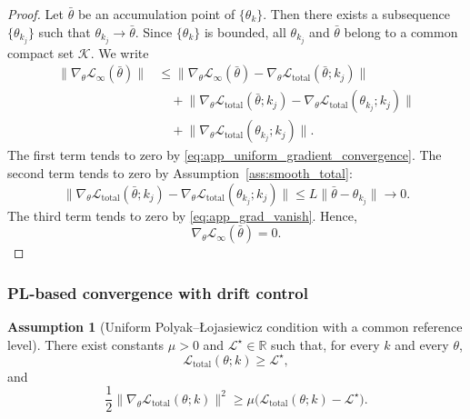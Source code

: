 \documentclass{article}
\theoremstyle{plain}
\theoremstyle{definition}
\newtheorem{assumption}[theorem]{Assumption}
\theoremstyle{remark}
\begin{document}
\begin{proof}
	Let $\bar{\theta}$ be an accumulation point of $\{\theta_k\}$.
	Then there exists a subsequence $\{\theta_{k_j}\}$ such that
	$\theta_{k_j}\to\bar{\theta}$.
	Since $\{\theta_k\}$ is bounded, all $\theta_{k_j}$ and $\bar{\theta}$
	belong to a common compact set $\mathcal K$.
	We write
	\begin{align}
		\bigl\|
		\nabla_{\theta}\mathcal{L}_{\infty}(\bar{\theta})
		\bigr\|
		&\leqslant
		\bigl\|
		\nabla_{\theta}\mathcal{L}_{\infty}(\bar{\theta})
		-
		\nabla_{\theta}\mathcal{L}_{\mathrm{total}}(\bar{\theta};k_j)
		\bigr\|
		\nonumber\\
		&\quad
		+
		\bigl\|
		\nabla_{\theta}\mathcal{L}_{\mathrm{total}}(\bar{\theta};k_j)
		-
		\nabla_{\theta}\mathcal{L}_{\mathrm{total}}(\theta_{k_j};k_j)
		\bigr\|
		\nonumber\\
		&\quad
		+
		\bigl\|
		\nabla_{\theta}\mathcal{L}_{\mathrm{total}}(\theta_{k_j};k_j)
		\bigr\|.
		\label{eq:app_stationary_split}
	\end{align}
	The first term tends to zero by
	\eqref{eq:app_uniform_gradient_convergence}.
	The second term tends to zero by Assumption~\ref{ass:smooth_total}:
	\begin{equation}
		\bigl\|
		\nabla_{\theta}\mathcal{L}_{\mathrm{total}}(\bar{\theta};k_j)
		-
		\nabla_{\theta}\mathcal{L}_{\mathrm{total}}(\theta_{k_j};k_j)
		\bigr\|
		\leqslant
		L\|\bar{\theta}-\theta_{k_j}\|
		\to 0.
		\label{eq:app_stationary_smoothness}
	\end{equation}
	The third term tends to zero by \eqref{eq:app_grad_vanish}.
	Hence,
	\begin{equation}
		\nabla_{\theta}\mathcal{L}_{\infty}(\bar{\theta})=0.
		\label{eq:app_stationary_limit}
	\end{equation}
\end{proof}

\subsubsection{PL-based convergence with drift control}

\begin{assumption}[Uniform Polyak--\L{}ojasiewicz condition with a common reference level]
	\label{ass:PL}
	There exist constants $\mu>0$ and
	$\mathcal{L}^{\star}\in\mathbb{R}$ such that, for every $k$ and every
	$\theta$,
	\begin{equation}
		\mathcal{L}_{\mathrm{total}}(\theta;k)\geqslant \mathcal{L}^{\star},
		\label{eq:app_PL_lower}
	\end{equation}
	and
	\begin{equation}
		\frac{1}{2}
		\bigl\|
		\nabla_{\theta}\mathcal{L}_{\mathrm{total}}(\theta;k)
		\bigr\|^2
		\geqslant
		\mu
		\bigl(
		\mathcal{L}_{\mathrm{total}}(\theta;k)-\mathcal{L}^{\star}
		\bigr).
		\label{eq:app_PL_condition}
	\end{equation}
\end{assumption}
\end{document}
